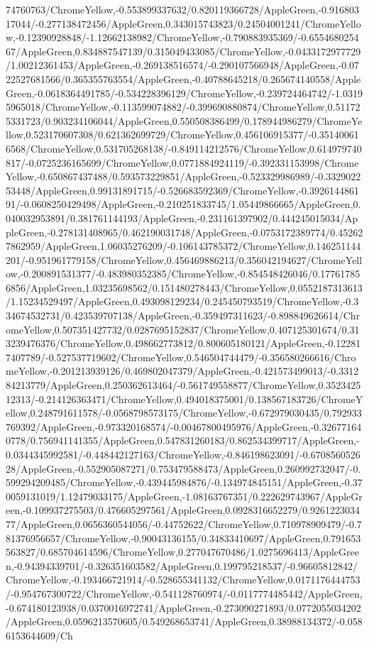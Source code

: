 {\begin{tikzternal}
74760763/ChromeYellow,-0.553899337632/0.820119366728/AppleGreen,-0.91680317044/-0.277138472456/AppleGreen,0.343015743823/0.24504001241/ChromeYellow,-0.12390928848/-1.12662138982/ChromeYellow,-0.790883935369/-0.655468025467/AppleGreen,0.834887547139/0.315049433085/ChromeYellow,-0.0433172977729/1.00212361453/AppleGreen,-0.269138516574/-0.290107566948/AppleGreen,-0.0722527681566/0.365355763554/AppleGreen,-0.40788645218/0.265674140558/AppleGreen,-0.0618364491785/-0.534228396129/ChromeYellow,-0.239724464742/-1.03195965018/ChromeYellow,-0.113599074882/-0.399690880874/ChromeYellow,0.511725331723/0.903234106044/AppleGreen,0.550508386499/0.178944986279/ChromeYellow,0.523170607308/0.621362699729/ChromeYellow,0.456106915377/-0.351400616568/ChromeYellow,0.531705268138/-0.849114212576/ChromeYellow,0.614979740817/-0.0725236165699/ChromeYellow,0.0771884924119/-0.392331153998/ChromeYellow,-0.650867437488/0.593573229851/AppleGreen,-0.523329986989/-0.332902253448/AppleGreen,0.99131891715/-0.526683592369/ChromeYellow,-0.392614486191/-0.0608250429498/AppleGreen,-0.210251833745/1.05449866665/AppleGreen,0.040032953891/0.381761144193/AppleGreen,-0.231161397902/0.444245015034/AppleGreen,-0.278131408965/0.462190031748/AppleGreen,-0.0753172389774/0.452627862959/AppleGreen,1.06035276209/-0.106143785372/ChromeYellow,0.146251144201/-0.951961779158/ChromeYellow,0.456469886213/0.356042194627/ChromeYellow,-0.200891531377/-0.483980352385/ChromeYellow,-0.854548426046/0.177617856856/AppleGreen,1.03235698562/0.151480278443/ChromeYellow,0.0552187313613/1.15234529497/AppleGreen,0.493098129234/0.245450793519/ChromeYellow,-0.334674532731/0.423539707138/AppleGreen,-0.359497311623/-0.898849626614/ChromeYellow,0.507351427732/0.0287695152837/ChromeYellow,0.407125301674/0.313239476376/ChromeYellow,0.498662773812/0.800605180121/AppleGreen,-0.122817407789/-0.527537719602/ChromeYellow,0.546504744479/-0.356580266616/ChromeYellow,-0.201213939126/0.469802047379/AppleGreen,-0.421573499013/-0.331284213779/AppleGreen,0.250362613464/-0.561749558877/ChromeYellow,0.352342512313/-0.214126363471/ChromeYellow,0.494018375001/0.138567183726/ChromeYellow,0.248791611578/-0.0568798573175/ChromeYellow,-0.672979030435/0.792933769392/AppleGreen,-0.973320168574/-0.00467800495976/AppleGreen,-0.326771640778/0.756941141355/AppleGreen,0.547831260183/0.862534399717/AppleGreen,-0.0344345992581/-0.448442127163/ChromeYellow,-0.846198623091/-0.670856052628/AppleGreen,-0.552905087271/0.753479588473/AppleGreen,0.260992732047/-0.599294209485/ChromeYellow,-0.439445984876/-0.134974845151/AppleGreen,-0.370059131019/1.12479033175/AppleGreen,-1.08163767351/0.222629743967/AppleGreen,-0.109937275503/0.476605297561/AppleGreen,0.0928316652279/0.926122303477/AppleGreen,0.0656360544056/-0.44752622/ChromeYellow,0.710978909479/-0.781376956657/ChromeYellow,-0.90043136155/0.34833410697/AppleGreen,0.791653563827/0.685704614596/ChromeYellow,0.277047670486/1.0275696413/AppleGreen,-0.94394339701/-0.326351603582/AppleGreen,0.199795218537/-0.96605812842/ChromeYellow,-0.193466721914/-0.528655341132/ChromeYellow,0.0171176444753/-0.954767300722/ChromeYellow,-0.541128760974/-0.0117774485442/AppleGreen,-0.674180123938/0.0370016972741/AppleGreen,-0.273090271893/0.0772055034202/AppleGreen,0.0596213570605/0.549268653741/AppleGreen,0.38988134372/-0.0586153644609/Ch
\end{tikzternal}}
